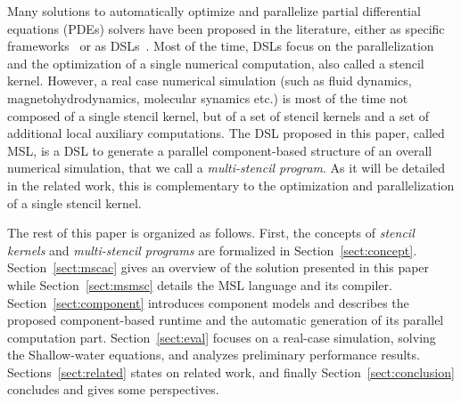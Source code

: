 Many solutions to automatically optimize and parallelize partial differential equations (PDEs) solvers have been proposed in the literature, either as specific frameworks~\cite{petsc-efficient,Trilinos-Overview,CPE:CPE3494} or as DSLs~\cite{spaaTangCKLL11,citeulike12258902,Giles2011,DeVito2011LDS}. Most of the time, DSLs focus on the parallelization and the optimization of a single numerical computation, also called a stencil kernel.
However, a real case numerical simulation (such as fluid dynamics, magnetohydrodynamics, molecular synamics etc.) is most of the time not composed of a single stencil kernel, but of a set of stencil kernels and a set of additional local auxiliary computations. The DSL proposed in this paper, called MSL, is a DSL to generate a parallel component-based structure of an overall numerical simulation, that we call a \emph{multi-stencil program}. As it will be detailed in the related work, this is complementary to the optimization and parallelization of a single stencil kernel.

The rest of this paper is organized as follows. First, the concepts of \emph{stencil kernels} and \emph{multi-stencil programs} are formalized in Section~\ref{sect:concept}. Section~\ref{sect:mscac} gives an overview of the solution presented in this paper while Section~\ref{sect:msmsc} details the MSL language and its compiler. Section~\ref{sect:component} introduces component models and describes the proposed component-based runtime and the automatic generation of its parallel computation part.
Section~\ref{sect:eval} focuses on a real-case simulation, solving the Shallow-water equations, and analyzes preliminary performance results. Sections~\ref{sect:related} states on related work, and finally Section~\ref{sect:conclusion} concludes and gives some perspectives.

